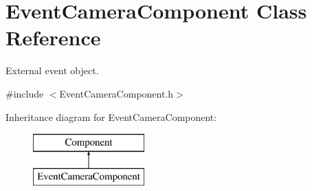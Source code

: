 \hypertarget{class_event_camera_component}{\section{Event\+Camera\+Component Class Reference}
\label{class_event_camera_component}
}


External event object.  




{\ttfamily \#include $<$Event\+Camera\+Component.\+h$>$}

Inheritance diagram for Event\+Camera\+Component\+:\begin{figure}[H]
\begin{center}
\leavevmode
\includegraphics[height=2.000000cm]{class_event_camera_component}
\end{center}
\end{figure}
